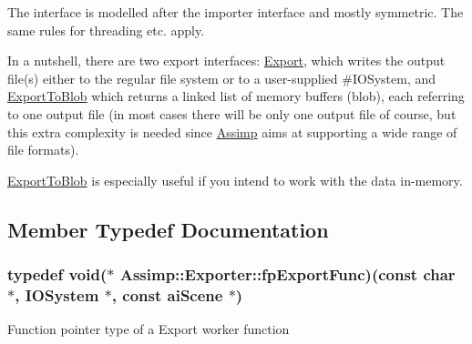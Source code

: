 The interface is modelled after the importer interface and mostly symmetric. The same rules for threading etc. apply.

In a nutshell, there are two export interfaces\-: \hyperlink{class_assimp_1_1_exporter_ab8edf249172567a78ca302278a415e35}{Export}, which writes the output file(s) either to the regular file system or to a user-\/supplied \#\-I\-O\-System, and \hyperlink{class_assimp_1_1_exporter_a390c0950a3a164fc431e0797ae1a84d1}{Export\-To\-Blob} which returns a linked list of memory buffers (blob), each referring to one output file (in most cases there will be only one output file of course, but this extra complexity is needed since \hyperlink{namespace_assimp}{Assimp} aims at supporting a wide range of file formats).

\hyperlink{class_assimp_1_1_exporter_a390c0950a3a164fc431e0797ae1a84d1}{Export\-To\-Blob} is especially useful if you intend to work with the data in-\/memory. 

\subsection{Member Typedef Documentation}
\hypertarget{class_assimp_1_1_exporter_aa67334a75cb24e030af984d01e622f3b}{
\subsubsection[{fp\-Export\-Func}]{\setlength{\rightskip}{0pt plus 5cm}typedef {\bf void}($\ast$ Assimp\-::\-Exporter\-::fp\-Export\-Func)(const char $\ast$, {\bf I\-O\-System} $\ast$, const ai\-Scene $\ast$)}}\label{class_assimp_1_1_exporter_aa67334a75cb24e030af984d01e622f3b}
Function pointer type of a Export worker function 

